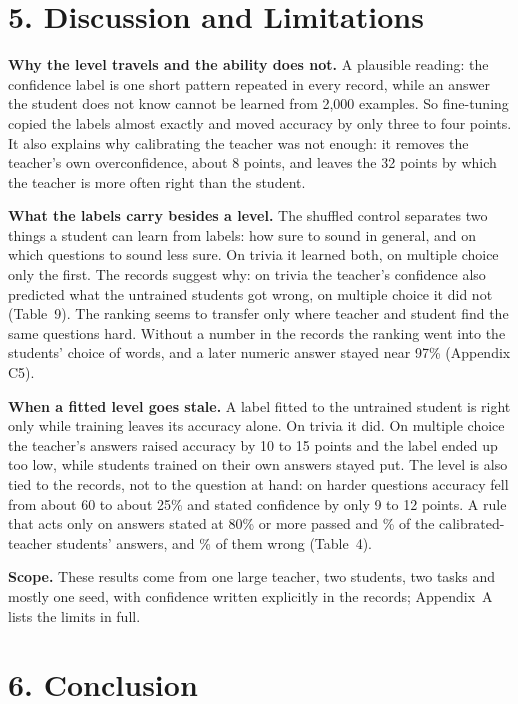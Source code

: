 \documentclass[10pt]{article}
\begin{document}
\section*{5. Discussion and Limitations}

\textbf{Why the level travels and the ability does not.} A plausible reading: the confidence label is one short pattern repeated in every record, while an answer the student does not know cannot be learned from 2{,}000 examples. So fine-tuning copied the labels almost exactly and moved accuracy by only three to four points. It also explains why calibrating the teacher was not enough: it removes the teacher's own overconfidence, about 8 points, and leaves the 32 points by which the teacher is more often right than the student.

\textbf{What the labels carry besides a level.} The shuffled control separates two things a student can learn from labels: how sure to sound in general, and on which questions to sound less sure. On trivia it learned both, on multiple choice only the first. The records suggest why: on trivia the teacher's confidence also predicted what the untrained students got wrong, on multiple choice it did not (Table~9). The ranking seems to transfer only where teacher and student find the same questions hard. Without a number in the records the ranking went into the students' choice of words, and a later numeric answer stayed near 97\% (Appendix C5).

\textbf{When a fitted level goes stale.} A label fitted to the untrained student is right only while training leaves its accuracy alone. On trivia it did. On multiple choice the teacher's answers raised accuracy by 10 to 15 points and the label ended up too low, while students trained on their own answers stayed put. The level is also tied to the records, not to the question at hand: on harder questions accuracy fell from about 60 to about 25\% and stated confidence by only 9 to 12 points. A rule that acts only on answers stated at 80\% or more passed \rQTcalPass{} and \rGTcalPass{}\% of the calibrated-teacher students' answers, \rQTcalWrong{} and \rGTcalWrong{}\% of them wrong (Table~4).

\textbf{Scope.} These results come from one large teacher, two students, two tasks and mostly one seed, with confidence written explicitly in the records; Appendix~A lists the limits in full.

\section*{6. Conclusion}
\end{document}
